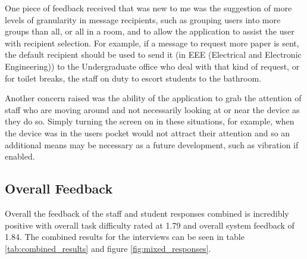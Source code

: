 One piece of feedback received that was new to me was the suggestion of more levels of granularity in message recipients, such as grouping users into more groups than all, or all in a room, and to allow the application to assist the user with recipient selection.  For example, if a message to request more paper is sent, the default recipient should be used to send it (in EEE (Electrical and Electronic Engineering)) to the Undergraduate office who deal with that kind of request, or for toilet breaks, the staff on duty to escort students to the bathroom.

Another concern raised was the ability of the application to grab the attention of staff who are moving around and not necessarily looking at or near the device as they do so.  Simply turning the screen on in these situations, for example, when the device was in the users pocket would not attract their attention and so an additional means may be necessary as a future development, such as vibration if enabled.

\subsection{Overall Feedback}

Overall the feedback of the staff and student responses combined is incredibly positive with overall task difficulty rated at 1.79 and overall system feedback of 1.84.  The combined results for the interviews can be seen in table \ref{tab:combined_results} and figure \ref{fig:mixed_responses}.

